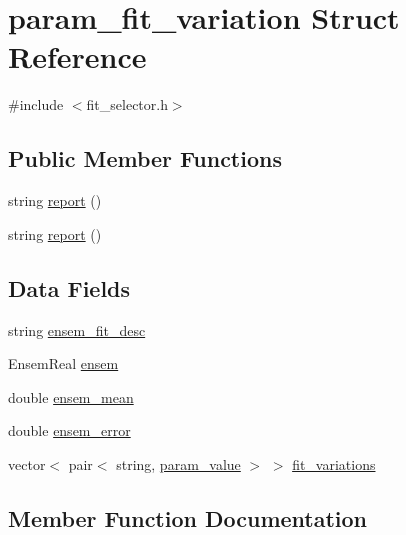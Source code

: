 \hypertarget{structparam__fit__variation}{}\section{param\+\_\+fit\+\_\+variation Struct Reference}
\label{structparam__fit__variation}


{\ttfamily \#include $<$fit\+\_\+selector.\+h$>$}

\subsection*{Public Member Functions}
\begin{DoxyCompactItemize}
\item 
string \mbox{\hyperlink{structparam__fit__variation_ad23e3d149021d2847c33d2b77e4f7db1}{report}} ()
\item 
string \mbox{\hyperlink{structparam__fit__variation_ad23e3d149021d2847c33d2b77e4f7db1}{report}} ()
\end{DoxyCompactItemize}
\subsection*{Data Fields}
\begin{DoxyCompactItemize}
\item 
string \mbox{\hyperlink{structparam__fit__variation_ad6753490295d63c1cbb8b257a9495b57}{ensem\+\_\+fit\+\_\+desc}}
\item 
Ensem\+Real \mbox{\hyperlink{structparam__fit__variation_a6478d4ad924a19408509b65a03e5ed18}{ensem}}
\item 
double \mbox{\hyperlink{structparam__fit__variation_a0580963f2d450a780856dd6e0649692a}{ensem\+\_\+mean}}
\item 
double \mbox{\hyperlink{structparam__fit__variation_acf3fd58d0c5bdc530315e5f20f91da07}{ensem\+\_\+error}}
\item 
vector$<$ pair$<$ string, \mbox{\hyperlink{structparam__value}{param\+\_\+value}} $>$ $>$ \mbox{\hyperlink{structparam__fit__variation_a53d47fece34925bab9f7342fc2ef4ff5}{fit\+\_\+variations}}
\end{DoxyCompactItemize}


\subsection{Member Function Documentation}
\mbox{\label{structparam__fit__variation_ad23e3d149021d2847c33d2b77e4f7db1}} 
